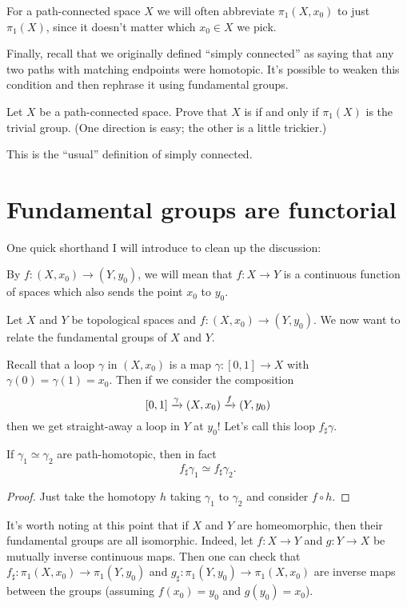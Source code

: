 \begin{abuse}
	For a path-connected space $X$ we will often abbreviate $\pi_1(X, x_0)$
	to just $\pi_1(X)$, since it doesn't matter which $x_0 \in X$
	we pick.
\end{abuse}

Finally, recall that we originally defined ``simply connected'' as saying
that any two paths with matching endpoints were homotopic.
It's possible to weaken this condition and then rephrase it using
fundamental groups.
\begin{exercise}
	Let $X$ be a path-connected space.
	Prove that $X$ is  if and only if
	$\pi_1(X)$ is the trivial group.
	(One direction is easy; the other is a little trickier.)
\end{exercise}
This is the ``usual'' definition of simply connected.


\section{Fundamental groups are functorial}
One quick shorthand I will introduce to clean up the discussion:
\begin{definition}
	By $f : (X, x_0) \to (Y, y_0)$, we will mean that
	$f : X \to Y$ is a continuous function of spaces
	which also sends the point $x_0$ to $y_0$.
\end{definition}

Let $X$ and $Y$ be topological spaces and $f : (X, x_0) \to (Y, y_0)$.
We now want to relate the fundamental groups of $X$ and $Y$.

Recall that a loop $\gamma$ in $(X, x_0)$ is a map $\gamma : [0,1] \to X$
with $\gamma(0) = \gamma(1) = x_0$.
Then if we consider the composition
\[ [0,1] \xrightarrow{\gamma} (X, x_0) \xrightarrow{f} (Y, y_0) \]
then we get straight-away a loop in $Y$ at $y_0$!
Let's call this loop $f_\sharp \gamma$.
\begin{lemma}
	\label{lem:fsharp_homotopy_invariant}
	If $\gamma_1 \simeq \gamma_2$ are path-homotopic,
	then in fact
	\[ f_\sharp \gamma_1 \simeq f_\sharp \gamma_2. \]
\end{lemma}
\begin{proof}
	Just take the homotopy $h$ taking $\gamma_1$ to $\gamma_2$	
	and consider $f \circ h$.
\end{proof}

It's worth noting at this point that if $X$ and $Y$ are homeomorphic,
then their fundamental groups are all isomorphic.
Indeed, let $f : X \to Y$ and $g : Y \to X$ be mutually inverse continuous maps.
Then one can check that $f_\sharp : \pi_1(X, x_0) \to \pi_1(Y, y_0)$
and $g_\sharp : \pi_1(Y, y_0) \to \pi_1(X, x_0)$ are inverse maps
between the groups (assuming $f(x_0) = y_0$ and $g(y_0) = x_0$).

